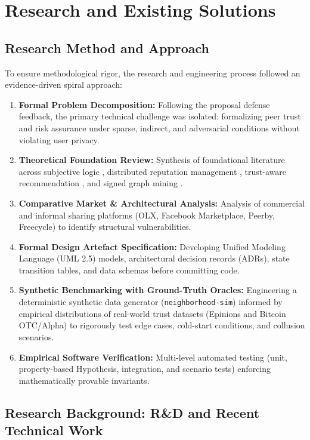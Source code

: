 \chapter{Research and Existing Solutions}

\section{Research Method and Approach}
To ensure methodological rigor, the research and engineering process followed an evidence-driven spiral approach:
\begin{enumerate}
    \item \textbf{Formal Problem Decomposition:} Following the proposal defense feedback, the primary technical challenge was isolated: formalizing peer trust and risk assurance under sparse, indirect, and adversarial conditions without violating user privacy.
    \item \textbf{Theoretical Foundation Review:} Synthesis of foundational literature across subjective logic \citep{josang2007subjective}, distributed reputation management \citep{kamvar2003eigentrust, resnick2000reputation}, trust-aware recommendation \citep{massa2007trust}, and signed graph mining \citep{kumar2016edge}.
    \item \textbf{Comparative Market \& Architectural Analysis:} Analysis of commercial and informal sharing platforms (OLX, Facebook Marketplace, Peerby, Freecycle) to identify structural vulnerabilities.
    \item \textbf{Formal Design Artefact Specification:} Developing Unified Modeling Language (UML 2.5) models, architectural decision records (ADRs), state transition tables, and data schemas before committing code.
    \item \textbf{Synthetic Benchmarking with Ground-Truth Oracles:} Engineering a deterministic synthetic data generator (\texttt{neighborhood-sim}) informed by empirical distributions of real-world trust datasets (Epinions and Bitcoin OTC/Alpha) to rigorously test edge cases, cold-start conditions, and collusion scenarios.
    \item \textbf{Empirical Software Verification:} Multi-level automated testing (unit, property-based Hypothesis, integration, and scenario tests) enforcing mathematically provable invariants.
\end{enumerate}

\section{Research Background: R\&D and Recent Technical Work}

